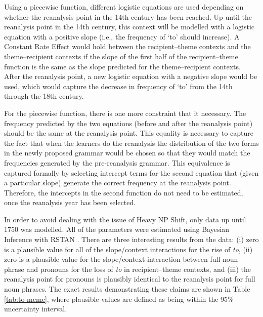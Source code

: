 	Using a piecewise function, different logistic equations are used depending on whether the reanalysis point in the 14th century has been reached. Up until the reanalysis point in the 14th century, this context will be modelled with a logistic equation with a positive slope (i.e., the frequency of `to' should increase). A Constant Rate Effect would hold between the recipient--theme contexts and the theme--recipient contexts if the slope of the first half of the recipient--theme function is the same as the slope predicted for the theme--recipient contexts. After the reanalysis point, a new logistic equation with a negative slope would be used, which would capture the decrease in frequency of `to' from the 14th through the 18th century.

	For the piecewise function, there is one more constraint that it necessary. The frequency predicted by the two equations (before and after the reanalysis point) should be the same at the reanalysis point. This equality is necessary to capture the fact that when the learners do the reanalysis the distribution of the two forms in the newly proposed grammar would be chosen so that they would match the frequencies generated by the pre-reanalysis grammar. This equivalence is captured formally by selecting intercept terms for the second equation that (given a particular slope) generate the correct frequency at the reanalysis point. Therefore, the intercepts in the second function do not need to be estimated, once the reanalysis year has been selected.

	In order to avoid dealing with the issue of Heavy NP Shift, only data up until 1750 was modelled. All of the parameters were estimated using Bayesian Inference with RSTAN \citep{stan.2016}. There are three interesting results from the data: (i) zero is a plausible value for all of the slope/context interactions for the rise of \textit{to}, (ii) zero is a plausible value for the slope/context interaction between full noun phrase and pronouns for the loss of \textit{to} in recipient--theme contexts, and (iii) the reanalysis point for pronouns is plausibly identical to the reanalysis point for full noun phrases. The exact results demonstrating these claims are shown in Table \ref{tab:to-mcmc}, where plausible values are defined as being within the 95\% uncertainty interval.



